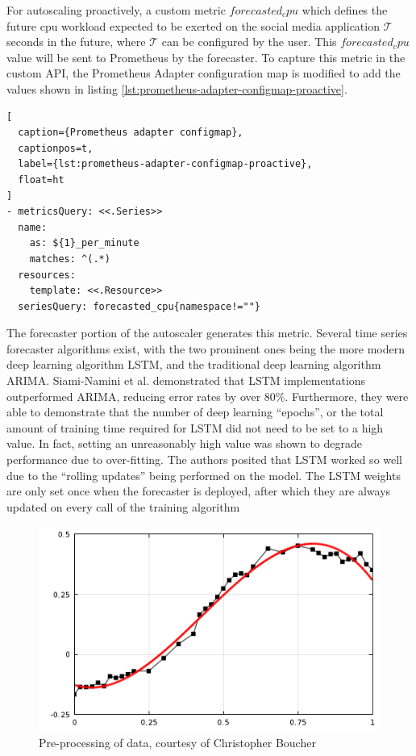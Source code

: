 For autoscaling proactively, a custom metric $forecasted_cpu$ which defines the future cpu workload expected to be exerted on the social media application $\mathcal{T}$ seconds in the future, where $\mathcal{T}$ can be configured by the user. This $forecasted_cpu$ value will be sent to Prometheus by the forecaster. To capture this metric in the custom API, the Prometheus Adapter configuration map is modified to add the values shown in listing \ref{lst:prometheus-adapter-configmap-proactive}.

\begin{lstlisting}[
  caption={Prometheus adapter configmap},
  captionpos=t,
  label={lst:prometheus-adapter-configmap-proactive},
  float=ht
]
- metricsQuery: <<.Series>>
  name:
    as: ${1}_per_minute
    matches: ^(.*)
  resources:
    template: <<.Resource>>
  seriesQuery: forecasted_cpu{namespace!=""}
\end{lstlisting}

The forecaster portion of the autoscaler generates this metric. Several time series forecaster algorithms exist, with the two prominent ones being the more modern deep learning algorithm LSTM, and the traditional deep learning algorithm ARIMA. Siami-Namini et al. \cite{siami2018comparison} demonstrated that LSTM implementations outperformed ARIMA, reducing error rates by over 80\%. Furthermore, they were able to demonstrate that the number of deep learning ``epochs'', or the total amount of training time required for LSTM did not need to be set to a high value. In fact, setting an unreasonably high value was shown to degrade performance due to over-fitting. The authors posited that LSTM worked so well due to the ``rolling updates'' being performed on the model. The LSTM weights are only set once when the forecaster is deployed, after which they are always updated on every call of the training algorithm\par

\begin{figure}[htb]
    \centering
    \caption{Pre-processing of data, courtesy of Christopher Boucher \cite{comsolcurvefitting}}
    \label{fig:data-pre-process}
    \includegraphics[width=0.6\linewidth]{Figures/Data-Pre-Processing.png}
\end{figure}


